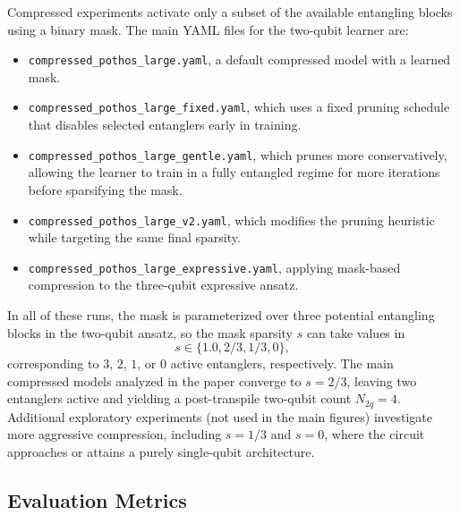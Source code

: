 \documentclass[conference]{IEEEtran}
\begin{document}
Compressed experiments activate only a subset of the available entangling blocks using a binary mask. The main YAML files for the two-qubit learner are:
\begin{itemize}
    \item \texttt{compressed\_pothos\_large.yaml}, a default compressed model with a learned mask.
    \item \texttt{compressed\_pothos\_large\_fixed.yaml}, which uses a fixed pruning schedule that disables selected entanglers early in training.
    \item \texttt{compressed\_pothos\_large\_gentle.yaml}, which prunes more conservatively, allowing the learner to train in a fully entangled regime for more iterations before sparsifying the mask.
    \item \texttt{compressed\_pothos\_large\_v2.yaml}, which modifies the pruning heuristic while targeting the same final sparsity.
    \item \texttt{compressed\_pothos\_large\_expressive.yaml}, applying mask-based compression to the three-qubit expressive ansatz.
\end{itemize}

In all of these runs, the mask is parameterized over three potential entangling blocks in the two-qubit ansatz, so the mask sparsity $s$ can take values in
\[
s \in \{1.0, 2/3, 1/3, 0\},
\]
corresponding to $3$, $2$, $1$, or $0$ active entanglers, respectively. The main compressed models analyzed in the paper converge to $s = 2/3$, leaving two entanglers active and yielding a post-transpile two-qubit count $N_{2q}=4$. Additional exploratory experiments (not used in the main figures) investigate more aggressive compression, including $s = 1/3$ and $s = 0$, where the circuit approaches or attains a purely single-qubit architecture.

\subsection{Evaluation Metrics}
\end{document}
